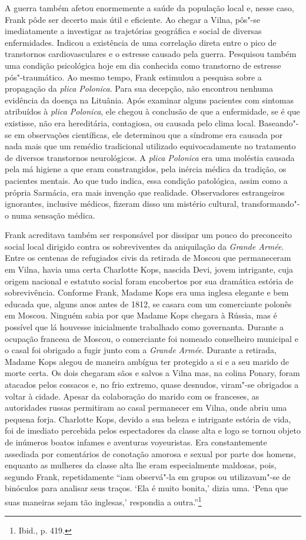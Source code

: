 A guerra também afetou enormemente a saúde da população local e, nesse
caso, Frank pôde ser decerto mais útil e eficiente. Ao chegar a Vilna,
pôs"-se imediatamente a investigar as trajetórias geográfica e social de
diversas enfermidades. Indicou a existência de uma correlação direta
entre o pico de transtornos cardiovasculares e o estresse causado pela
guerra. Pesquisou também uma condição psicológica hoje em dia conhecida
como transtorno de estresse pós"-traumático. Ao mesmo tempo, Frank
estimulou a pesquisa sobre a propagação da \emph{plica Polonica}. Para
sua decepção, não encontrou nenhuma evidência da doença na Lituânia.
Após examinar alguns pacientes com sintomas atribuídos à \emph{plica
Polonica}, ele chegou à conclusão de que a enfermidade, se é que
existisse, não era hereditária, contagiosa, ou causada pelo clima local.
Baseando"-se em observações científicas, ele determinou que a síndrome
era causada por nada mais que um remédio tradicional utilizado
equivocadamente no tratamento de diversos transtornos neurológicos. A
\emph{plica Polonica} era uma moléstia causada pela má higiene a que
eram constrangidos, pela inércia médica da tradição, os pacientes
mentais. Ao que tudo indica, essa condição patológica, assim como a
própria Sarmácia, era mais invenção que realidade. Observadores
estrangeiros ignorantes, inclusive médicos, fizeram disso um mistério
cultural, transformando"-o numa sensação médica.

Frank acreditava também ser responsável por dissipar um pouco do
preconceito social local dirigido contra os sobreviventes da aniquilação
da \emph{Grande Armée}. Entre os centenas de refugiados civis da
retirada de Moscou que permaneceram em Vilna, havia uma certa Charlotte
Kops, nascida Devi, jovem intrigante, cuja origem nacional e estatuto
social foram encobertos por sua dramática estória de sobrevivência.
Conforme Frank, Madame Kops era uma inglesa elegante e bem educada que,
alguns anos antes de 1812, se casara com um comerciante polonês em
Moscou. Ninguém sabia por que Madame Kops chegara à Rússia, mas é
possível que lá houvesse inicialmente trabalhado como governanta.
Durante a ocupação francesa de Moscou, o comerciante foi nomeado
conselheiro municipal e o casal foi obrigado a fugir junto com a
\emph{Grande Armée}. Durante a retirada, Madame Kops alegou de maneira
ambígua ter protegido a si e a seu marido de morte certa. Os dois
chegaram sãos e salvos a Vilna mas, na colina Ponary, foram atacados
pelos cossacos e, no frio extremo, quase desnudos, viram"-se obrigados a
voltar à cidade. Apesar da colaboração do marido com os franceses, as
autoridades russas permitiram ao casal permanecer em Vilna, onde abriu
uma pequena forja. Charlotte Kops, devido a sua beleza e intrigante
estória de vida, foi de imediato percebida pelos espectadores da classe
alta e logo se tornou objeto de inúmeros boatos infames e aventuras
voyeuristas. Era constantemente assediada por comentários de conotação
amorosa e sexual por parte dos homens, enquanto as mulheres da classe
alta lhe eram especialmente maldosas, pois, segundo Frank, repetidamente
``iam observá"-la em grupos ou utilizavam"-se de binóculos para analisar
seus traços. `Ela é muito bonita,' dizia uma. `Pena que suas maneiras
sejam tão inglesas,' respondia a outra.''\footnote{Ibid., p. 419.}


